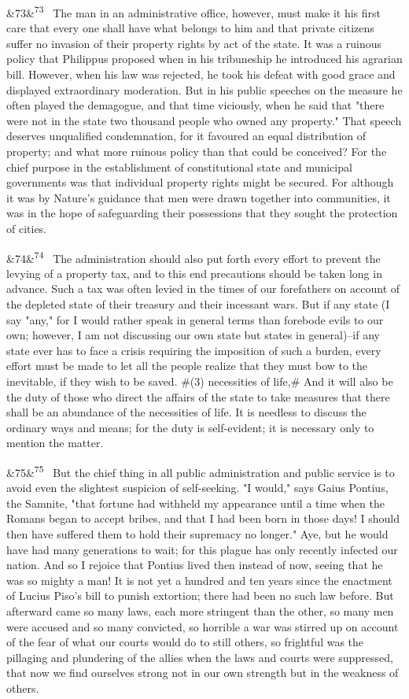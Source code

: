 \documentclass[12pt]{article}
\newcommand{\para}[1][]{\par\noindent\ifx&#1&\else\textsuperscript{\footnotesize #1}~\fi}
\begin{document}
\para[73] The man in an administrative office, however, must make it his first care that every one shall have what belongs to him and that private citizens suffer no invasion of their property rights by act of the state. It was a ruinous policy that Philippus proposed when in his tribuneship he introduced his agrarian bill. However, when his law was rejected, he took his defeat with good grace and displayed extraordinary moderation. But in his public speeches on the measure he often played the demagogue, and that time viciously, when he said that "there were not in the state two thousand people who owned any property." That speech deserves unqualified condemnation, for it favoured an equal distribution of property; and what more ruinous policy than that could be conceived? For the chief purpose in the establishment of constitutional state and municipal governments was that individual property rights might be secured. For although it was by Nature's guidance that men were drawn together into communities, it was in the hope of safeguarding their possessions that they sought the protection of cities.

\para[74] The administration should also put forth every effort to prevent the levying of a property tax, and to this end precautions should be taken long in advance. Such a tax was often levied in the times of our forefathers on account of the depleted state of their treasury and their incessant wars. But if any state (I say "any," for I would rather speak in general terms than forebode evils to our own; however, I am not discussing our own state but states in general)--if any state ever has to face a crisis requiring the imposition of such a burden, every effort must be made to let all the people realize that they must bow to the inevitable, if they wish to be saved. \#(3) necessities of life,\# And it will also be the duty of those who direct the affairs of the state to take measures that there shall be an abundance of the necessities of life. It is needless to discuss the ordinary ways and means; for the duty is self-evident; it is necessary only to mention the matter.

\para[75] But the chief thing in all public administration and public service is to avoid even the slightest suspicion of self-seeking. "I would," says Gaius Pontius, the Samnite, "that fortune had withheld my appearance until a time when the Romans began to accept bribes, and that I had been born in those days! I should then have suffered them to hold their supremacy no longer." Aye, but he would have had many generations to wait; for this plague has only recently infected our nation. And so I rejoice that Pontius lived then instead of now, seeing that he was so mighty a man! It is not yet a hundred and ten years since the enactment of Lucius Piso's bill to punish extortion; there had been no such law before. But afterward came so many laws, each more stringent than the other, so many men were accused and so many convicted, so horrible a war was stirred up on account of the fear of what our courts would do to still others, so frightful was the pillaging and plundering of the allies when the laws and courts were suppressed, that now we find ourselves strong not in our own strength but in the weakness of others.
\end{document}
